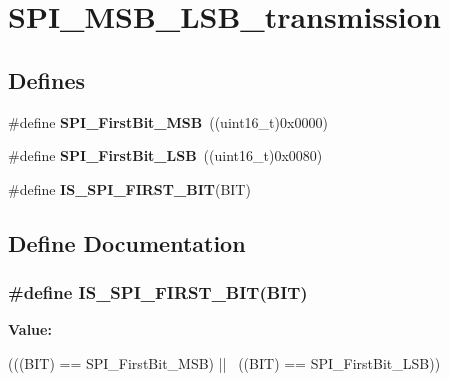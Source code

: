 \hypertarget{group__SPI__MSB__LSB__transmission}{
\section{SPI\_\-MSB\_\-LSB\_\-transmission}
\label{group__SPI__MSB__LSB__transmission}
}
\subsection*{Defines}
\begin{DoxyCompactItemize}
\item 
\hypertarget{group__SPI__MSB__LSB__transmission_ga45e688f93a93b605886240cad23bc2eb}{
\#define {\bfseries SPI\_\-FirstBit\_\-MSB}~((uint16\_\-t)0x0000)}
\label{group__SPI__MSB__LSB__transmission_ga45e688f93a93b605886240cad23bc2eb}

\item 
\hypertarget{group__SPI__MSB__LSB__transmission_ga5ef57fca79434cbc517e4ede548ca02d}{
\#define {\bfseries SPI\_\-FirstBit\_\-LSB}~((uint16\_\-t)0x0080)}
\label{group__SPI__MSB__LSB__transmission_ga5ef57fca79434cbc517e4ede548ca02d}

\item 
\#define {\bfseries IS\_\-SPI\_\-FIRST\_\-BIT}(BIT)
\end{DoxyCompactItemize}


\subsection{Define Documentation}
\hypertarget{group__SPI__MSB__LSB__transmission_gabee8e0302741f4a5c41b96af640c63ad}{
\subsubsection[{IS\_\-SPI\_\-FIRST\_\-BIT}]{\setlength{\rightskip}{0pt plus 5cm}\#define IS\_\-SPI\_\-FIRST\_\-BIT(BIT)}}
\label{group__SPI__MSB__LSB__transmission_gabee8e0302741f4a5c41b96af640c63ad}
{\bfseries Value:}
\begin{DoxyCode}
(((BIT) == SPI_FirstBit_MSB) || \
                               ((BIT) == SPI_FirstBit_LSB))
\end{DoxyCode}
